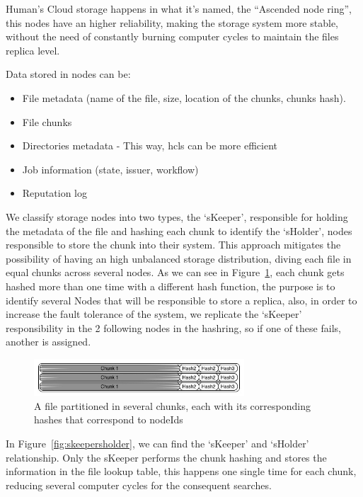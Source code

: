 \documentclass{./llncs2e/llncs}
\begin{document}
Human's Cloud storage happens in what it's named, the ``Ascended node ring'', this nodes have an higher reliability, making the storage system more stable, without the need of constantly burning computer cycles to maintain the files replica level.

Data stored in nodes can be:
\begin{itemize}
  \item File metadata (name of the file, size, location of the chunks, chunks hash).
  \item File chunks
  \item Directories metadata - This way, hcls can be more efficient 
  \item Job information (state, issuer, workflow)
  \item Reputation log
\end{itemize}

We classify storage nodes into two types, the `sKeeper', responsible for holding the metadata of the file and hashing each chunk to identify the `sHolder', nodes responsible to store the chunk into their system. This approach mitigates the possibility of having an high unbalanced storage distribution, diving each file in equal chunks across several nodes. As we can see in Figure~\ref{fig:chunking}, each chunk gets hashed more than one time with a different hash function, the purpose is to identify several Nodes that will be responsible to store a replica, also, in order to increase the fault tolerance of the system, we replicate the `sKeeper' responsibility in the 2 following nodes in the hashring, so if one of these fails, another is assigned.

\begin{figure}[h!]
  \centering
  \includegraphics[width=0.7\textwidth]{img/chunking.jpg}
  \caption{A file partitioned in several chunks, each with its corresponding hashes that correspond to nodeIds}
  \label{fig:chunking}
\end{figure}

In Figure~\ref{fig:skeepersholder}, we can find the `sKeeper' and `sHolder' relationship. Only the sKeeper performs the chunk hashing and stores the information in the file lookup table, this happens one single time for each chunk, reducing several computer cycles for the consequent searches.
\end{document}
